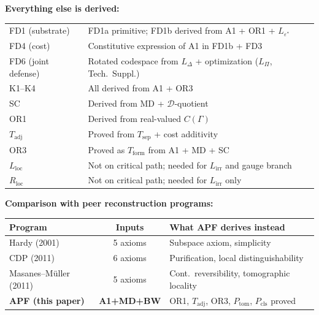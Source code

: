 \documentclass[11pt]{article}
\theoremstyle{remark}
\begin{document}
\medskip\noindent\textbf{Everything else is derived:}

\smallskip
\begin{center}
\smallskip
{\small
\begin{tabular*}{\textwidth}{@{\extracolsep{\fill}}ll@{}}
FD1 (substrate) & FD1a primitive; FD1b derived from A1 + OR1 + $L_{\varepsilon^*}$ \\[2pt]
FD4 (cost) & Constitutive expression of A1 in FD1b + FD3 \\[2pt]
FD6 (joint defense) & Rotated codespace from $L_\Delta$ + optimization ($L_\Pi$, Tech.\ Suppl.) \\[2pt]
K1--K4 & All derived from A1 + OR3 \\[2pt]
SC & Derived from MD + $\mathcal{D}$-quotient \\[2pt]
OR1 & Derived from real-valued $C(\Gamma)$ \\[2pt]
$T_{\mathrm{adj}}$ & Proved from $T_{\mathrm{sep}}$ + cost additivity \\[2pt]
OR3 & Proved as $T_{\mathrm{form}}$ from A1 + MD + SC \\[2pt]
$L_{\mathrm{loc}}$ & Not on critical path; needed for $L_{\mathrm{irr}}$ and gauge branch \\[2pt]
$R_{\mathrm{loc}}$ & Not on critical path; needed for $L_{\mathrm{irr}}$ only \\
\end{tabular*}}
\label{tab:derived_items}
\end{center}

\medskip\noindent\textbf{Comparison with peer reconstruction programs:}

\smallskip
\begin{center}
\smallskip
{\small
\begin{tabular*}{\textwidth}{@{\extracolsep{\fill}}lcl@{}}
\textbf{Program} & \textbf{Inputs} & \textbf{What APF derives instead} \\[2pt]
\hline\noalign{\smallskip}
Hardy (2001) & 5 axioms & Subspace axiom, simplicity \\
CDP (2011) & 6 axioms & Purification, local distinguishability \\
Masanes--M\"uller (2011) & 5 axioms & Cont.\ reversibility, tomographic locality \\
\textbf{APF (this paper)} & \textbf{A1+MD+BW} & OR1, $T_{\mathrm{adj}}$, OR3, $P_{\mathrm{tom}}$, $P_{\mathrm{cls}}$ proved \\
\end{tabular*}}
\label{tab:peer_comparison}
\end{center}
\end{document}
